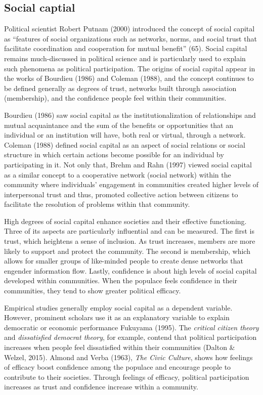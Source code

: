 \documentclass[
  english,
  man]{apa6}
\begin{document}
\hypertarget{social-captial}{%
\subsection{Social captial}\label{social-captial}}

Political scientist Robert Putnam (2000) introduced the concept of social capital as ``features of social organizations such as networks, norms, and social trust that facilitate coordination and cooperation for mutual benefit'' (65). Social capital remains much-discussed in political science and is particularly used to explain such phenomena as political participation. The origins of social capital appear in the works of Bourdieu (1986) and Coleman (1988), and the concept continues to be defined generally as degrees of trust, networks built through association (membership), and the confidence people feel within their communities.

Bourdieu (1986) saw social capital as the institutionalization of relationships and mutual acquaintance and the sum of the benefits or opportunities that an individual or an institution will have, both real or virtual, through a network. Coleman (1988) defined social capital as an aspect of social relations or social structure in which certain actions become possible for an individual by participating in it. Not only that, Brehm and Rahn (1997) viewed social capital as a similar concept to a cooperative network (social network) within the community where individuals' engagement in communities created higher levels of interpersonal trust and thus, promoted collective action between citizens to facilitate the resolution of problems within that community.

High degrees of social capital enhance societies and their effective functioning. Three of its aspects are particularly influential and can be measured. The first is trust, which heightens a sense of inclusion. As trust increases, members are more likely to support and protect the community. The second is membership, which allows for smaller groups of like-minded people to create dense networks that engender information flow. Lastly, confidence is about high levels of social capital developed within communities. When the populace feels confidence in their communities, they tend to show greater political efficacy.

Empirical studies generally employ social capital as a dependent variable. However, prominent scholars use it as an explanatory variable to explain democratic or economic performance Fukuyama (1995). The \emph{critical citizen theory} and \emph{dissatisfied democrat theory}, for example, contend that political participation increases when people feel dissatisfied within their communities (Dalton \& Welzel, 2015). Almond and Verba (1963), \emph{The Civic Culture}, shows how feelings of efficacy boost confidence among the populace and encourage people to contribute to their societies. Through feelings of efficacy, political participation increases as trust and confidence increase within a community.
\end{document}
